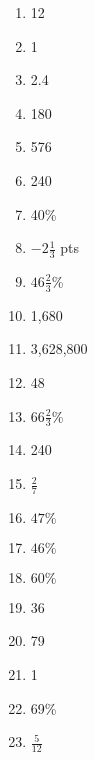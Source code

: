 \documentclass[../uilmath.tex]{subfiles}
\begin{document}
\begin{enumerate}[label=\bfseries\arabic*.]
    \item %
    12

    \item %
    1

    \item %
    2.4

    \item %
    180

    \item %
    576

    \item %
    240

    \item %
    40\%

    \item %
    $-2\frac{1}{3}$ pts 

    \item %
    $46\frac{2}{3}$\% 

    \item %
    1,680 

    \item %
    3,628,800

    \item %
    48 

    \item %
    $66\frac{2}{3}$\%

    \item %
    240

    \item %
    $\frac{2}{7}$

    \item %
    $47\%$

    \item %
    $46\%$

    \item %
    $60\%$

    \item %
    36 

    \item %
    79

    \item %
    1

    \item %
    69\%

    \item %
    $\frac{5}{12}$


\end{enumerate}
\end{document}
